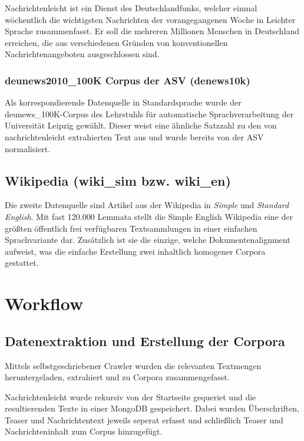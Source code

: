 \documentclass[12pt, a4paper]{article}
\begin{document}
Nachrichtenleicht ist ein Dienst des Deutschlandfunks, welcher einmal
w\"ochentlich die wichtigsten Nachrichten der vorangegangenen Woche in Leichter
Sprache zusammenfasst. Er soll die mehreren Millionen Menschen in Deutschland
erreichen, die aus verschiedenen Gr\"unden von konventionellen
Nachrichtenangeboten ausgeschlossen sind.

\subsubsection{deunews2010\_100K Corpus der ASV (denews10k)}

Als korrespondierende Datenquelle in Standardsprache wurde der
deunews\_100K-Corpus des Lehrstuhls f\"ur automatische Sprachverarbeitung
der Universit\"at Leipzig gew\"ahlt. Dieser weist eine \"ahnliche Satzzahl zu
den von nachrichtenleicht extrahierten Text aus und wurde bereits von der ASV
normalisiert.

\subsection{Wikipedia (wiki\_sim bzw. wiki\_en)}

Die zweite Datenquelle sind Artikel aus der Wikipedia in \emph{Simple} und
\emph{Standard English}. Mit fast 120.000 Lemmata stellt die Simple English
Wikipedia eine der gr\"o\ss{}ten \"offentlich frei verf\"ugbaren Textsammlungen
in einer einfachen Sprachvariante dar. Zus\"atzlich ist sie die
einzige, welche Dokumentenalignment aufweist, was die einfache Erstellung zwei
inhaltlich homogener Corpora gestattet.

\section{Workflow}
\subsection{Datenextraktion und Erstellung der Corpora}

Mittels selbstgeschriebener Crawler wurden die relevanten Textmengen
heruntergeladen, extrahiert und zu Corpora zusammengefasst.

Nachrichtenleicht wurde rekursiv von der Startseite gequeriet
und die resultierenden Texte in einer MongoDB gespeichert.
Dabei wurden Überschriften, Teaser und Nachrichtentext jeweils seperat erfasst
und schließlich Teaser und Nachrichteninhalt zum Corpus hinzugefügt.
\end{document}
